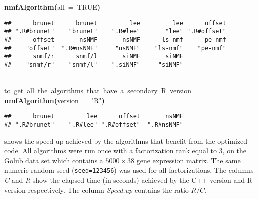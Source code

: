 \documentclass[a4paper]{article}\usepackage{graphicx, color}
\makeatletter
\newcommand{\hlnumber}[1]{\textcolor[rgb]{0,0,0}{#1}}%
\newcommand{\hlfunctioncall}[1]{\textcolor[rgb]{0.501960784313725,0,0.329411764705882}{\textbf{#1}}}%
\newcommand{\hlstring}[1]{\textcolor[rgb]{0.6,0.6,1}{#1}}%
\newcommand{\hlkeyword}[1]{\textcolor[rgb]{0,0,0}{\textbf{#1}}}%
\newcommand{\hlargument}[1]{\textcolor[rgb]{0.690196078431373,0.250980392156863,0.0196078431372549}{#1}}%
\newcommand{\hlcomment}[1]{\textcolor[rgb]{0.180392156862745,0.6,0.341176470588235}{#1}}%
\newcommand{\hlstd}[1]{\textcolor[rgb]{0,0,0}{#1}}%
\newenvironment{kframe}{%
 \def\FrameCommand##1{\hskip\@totalleftmargin \hskip-\fboxsep
 \colorbox{shadecolor}{##1}\hskip-\fboxsep
     \hskip-\linewidth \hskip-\@totalleftmargin \hskip\columnwidth}%
 \MakeFramed {\advance\hsize-\width
   \@totalleftmargin\z@ \linewidth\hsize
   \@setminipage}}%
 {\par\unskip\endMakeFramed}
\newenvironment{knitrout}{}{} %
\let\code=\texttt
\makeatother
\begin{document}
\begin{knitrout}
\color{fgcolor}\begin{kframe}
\begin{flushleft}
\ttfamily\noindent
\hlfunctioncall{nmfAlgorithm}\hlkeyword{(}\hlargument{all}{\ }\hlargument{=}{\ }\hlnumber{TRUE}\hlkeyword{)}\mbox{}
\normalfont
\end{flushleft}
\begin{verbatim}
##      brunet      brunet         lee         lee      offset 
## ".R#brunet"    "brunet"    ".R#lee"       "lee" ".R#offset" 
##      offset       nsNMF       nsNMF      ls-nmf      pe-nmf 
##    "offset"  ".R#nsNMF"     "nsNMF"    "ls-nmf"    "pe-nmf" 
##      snmf/r      snmf/l       siNMF       siNMF 
##    "snmf/r"    "snmf/l"    ".siNMF"     "siNMF" 
\end{verbatim}
\begin{flushleft}
\ttfamily\noindent
\hspace*{\fill}\\
\hlstd{}\hlcomment{\usebox{\hlnormalsizeboxhash}{\ }to{\ }get{\ }all{\ }the{\ }algorithms{\ }that{\ }have{\ }a{\ }secondary{\ }R{\ }version}\hspace*{\fill}\\
\hlstd{}\hlfunctioncall{nmfAlgorithm}\hlkeyword{(}\hlargument{version}{\ }\hlargument{=}{\ }\hlstring{"{}R"{}}\hlkeyword{)}\mbox{}
\normalfont
\end{flushleft}
\begin{verbatim}
##      brunet         lee      offset       nsNMF 
## ".R#brunet"    ".R#lee" ".R#offset"  ".R#nsNMF" 
\end{verbatim}
\end{kframe}
\end{knitrout}


 shows the speed-up achieved by the algorithms that benefit from the optimized code.
All algorithms were run once with a factorization rank equal to 3, on the Golub data set which contains a $5000\times 38$ gene expression matrix. 
The same numeric random seed (\code{seed=123456}) was used for all factorizations.
The columns \emph{C} and \emph{R} show the elapsed time (in seconds) achieved by the C++ version and R version respectively.
The column \emph{Speed.up} contains the ratio $R/C$. 
\end{document}
